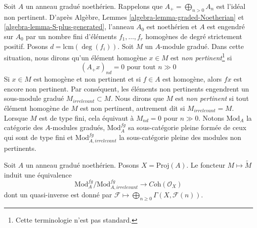 \noindent
Soit $A$ un anneau gradué noethérien. Rappelons que
$A_+ = \bigoplus_{n > 0} A_n$ est l'idéal non pertinent.
D'après Algèbre, Lemmes \ref{algebra-lemma-graded-Noetherian} et
\ref{algebra-lemma-S-plus-generated}, l'anneau $A_0$ est noethérien
et $A$ est engendré sur $A_0$ par un nombre fini d'éléments
$f_1, \ldots, f_r$ homogènes de degré strictement positif.
Posons $d = \text{lcm}(\deg(f_i))$. Soit $M$ un $A$-module gradué.
Dans cette situation, nous dirons qu'un élément homogène $x \in M$
est {\it non pertinent}\footnote{Cette terminologie n'est pas standard.} si
$$
(A_+ x)_{nd} = 0\text{ pour tout }n \gg 0
$$
Si $x \in M$ est homogène et non pertinent et si $f \in A$
est homogène, alors $fx$ est encore non pertinent. Par conséquent,
les éléments non pertinents engendrent un sous-module gradué
$M_{irrelevant} \subset M$. Nous dirons que $M$ est {\it non pertinent}
si tout élément homogène de $M$ est non pertinent, autrement dit si
$M_{irrelevant} = M$.
Lorsque $M$ est de type fini, cela équivaut à
$M_{nd} = 0$ pour $n \gg 0$.
Notons $\text{Mod}_A$ la catégorie des $A$-modules gradués,
$\text{Mod}^{fg}_A$ sa sous-catégorie pleine formée de ceux qui sont de type
fini et $\text{Mod}^{fg}_{A, irrelevant}$ la sous-catégorie pleine des
modules non pertinents.

\begin{proposition}
\label{proposition-coherent-modules-on-proj-general}
Soit $A$ un anneau gradué noethérien. Posons $X = \text{Proj}(A)$. Le foncteur
$M \mapsto \widetilde M$ induit une équivalence
$$
\text{Mod}^{fg}_A/\text{Mod}^{fg}_{A, irrelevant}
\longrightarrow
\textit{Coh}(\mathcal{O}_X)
$$
dont un quasi-inverse est donné par
$\mathcal{F} \longmapsto \bigoplus_{n \geq 0} \Gamma(X, \mathcal{F}(n))$.
\end{proposition}

